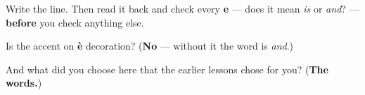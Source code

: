 Write the line. Then read it back and check every \textbf{e} — does it mean \emph{is} or \emph{and}? — \textbf{before} you check anything else.

\begin{tcolorbox}[breakable,colback=teal!4,colframe=teal!35!black,title={Before you move on}]
Is the accent on \textbf{è} decoration? (\textbf{No} — without it the word is \emph{and}.)

And what did you choose here that the earlier lessons chose for you? (\textbf{The words.})
\end{tcolorbox}

